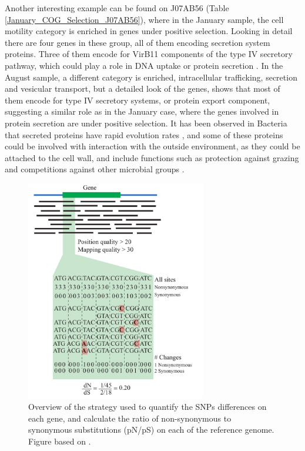 Another interesting example can be found on J07AB56 (Table \ref{January_COG_Selection_J07AB56}), where in the January sample, the cell motility category is enriched in genes under positive selection. Looking in detail there are four genes in these group, all of them encoding secretion system proteins. Three of them encode for VirB11 components of the type IV secretory pathway, which could play a role in DNA uptake or protein secretion \cite{Chandran:2009fg}. In the August sample, a different category is enriched, intracellular trafficking, secretion and vesicular transport, but a detailed look of the genes, shows that most of them encode for type IV secretory systems, or protein export component, suggesting a similar role as in the January case, where the genes involved in protein secretion are under positive selection. It has been observed in Bacteria that secreted proteins have rapid evolution rates \cite{Nogueira:2012gv}, and some of these proteins could be involved with interaction with the outside environment, as they could be attached to the cell wall, and include functions such as protection against grazing \cite{Matz:2005ik} and competitions against other microbial groups \cite{Kirkup:2004hj}.


\begin{figure}[!hbtp]
  \centering
  \includegraphics[width=0.7\textwidth]{Chapter5/Figures/MappingStrategy.pdf}
  \caption{Overview of the strategy used to quantify the SNPs differences on each gene, and calculate the ratio of non-synonymous to synonymous substitutions (pN/pS) on each of the reference genome. Figure based on \cite{Tai:2011jo}.}
  \label{MappingStrategy}
\end{figure}

